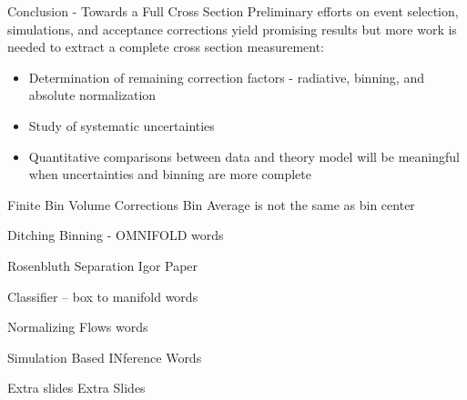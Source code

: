 \documentclass[aspectratio=169]{beamer}
\begin{document}
\begin{frame}{Conclusion - Towards a Full Cross Section}
Preliminary efforts on event selection, simulations, and acceptance corrections yield promising results but more work is needed to extract a complete cross section measurement:
\vspace{0.4cm}
\begin{itemize}
    \setlength\itemsep{1em}
    \item Determination of remaining correction factors - radiative, binning, and absolute normalization
    \item Study of systematic uncertainties 
    \item Quantitative comparisons between data and theory model will be meaningful when uncertainties and binning are more complete
\end{itemize}
    
\end{frame}



\appendix



\begin{frame}{Finite Bin Volume Corrections}
Bin Average is not the same as bin center


\end{frame}


\begin{frame}{Ditching Binning - OMNIFOLD}
words

\end{frame}

\begin{frame}{Rosenbluth Separation}
Igor Paper

\end{frame}

\begin{frame}{Classifier -- box to manifold}
words

\end{frame}


\begin{frame}{Normalizing Flows}
words

\end{frame}

\begin{frame}{Simulation Based INference}
Words
\end{frame}

\begin{frame}{Extra slides}
Extra Slides

\end{frame}
\end{document}
